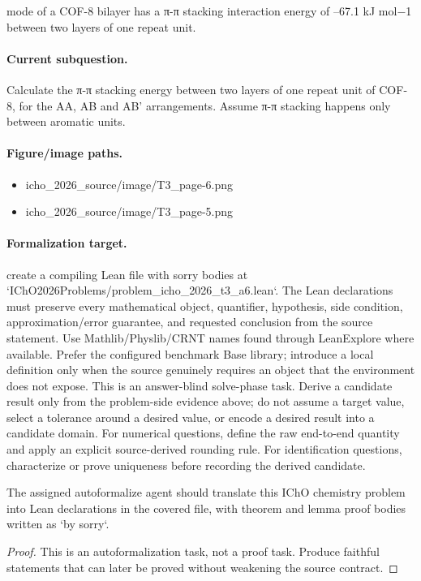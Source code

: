 mode of a COF-8 bilayer has a π-π stacking interaction energy of –67.1 kJ mol−1 between two layers of one repeat unit.

\paragraph{Current subquestion.}
Calculate the π-π stacking energy between two layers of one repeat unit of COF-8, for the AA, AB and AB' arrangements. Assume π-π stacking happens only between aromatic units.

\paragraph{Figure/image paths.}
\begin{itemize}
\item icho\_2026\_source/image/T3\_page-6.png
\item icho\_2026\_source/image/T3\_page-5.png
\end{itemize}

\paragraph{Formalization target.}
create a compiling Lean file with sorry bodies at `IChO2026Problems/problem\_icho\_2026\_t3\_a6.lean`.
The Lean declarations must preserve every mathematical object, quantifier, hypothesis, side condition, approximation/error guarantee, and requested conclusion from the source statement.
Use Mathlib/Physlib/CRNT names found through LeanExplore where available. Prefer the configured benchmark Base library; introduce a local definition only when the source genuinely requires an object that the environment does not expose.
This is an answer-blind solve-phase task. Derive a candidate result only from the problem-side evidence above; do not assume a target value, select a tolerance around a desired value, or encode a desired result into a candidate domain.
For numerical questions, define the raw end-to-end quantity and apply an explicit source-derived rounding rule. For identification questions, characterize or prove uniqueness before recording the derived candidate.

\begin{theorem}
\label{thm:physics:icho_2026_t3_a6:target}
The assigned autoformalize agent should translate this IChO chemistry problem into Lean declarations in the covered file, with theorem and lemma proof bodies written as `by sorry`.
\end{theorem}
\begin{proof}
This is an autoformalization task, not a proof task. Produce faithful statements that can later be proved without weakening the source contract.
\end{proof}
